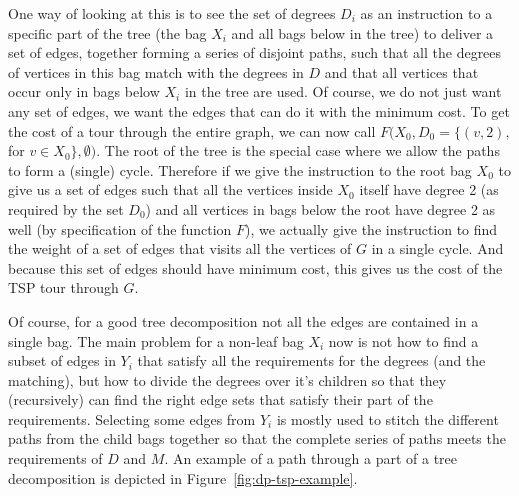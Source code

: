 \documentclass[12pt]{article}
\begin{document}
    One way of looking at this is to see the set of degrees $D_i$ as an instruction to a specific
    part of the tree (the bag $X_i$ and all bags below in the tree) to deliver a set of edges,
    together forming a series of disjoint paths, such that all the degrees of vertices in this bag
    match with the degrees in $D$ and that all vertices that occur only in bags below $X_i$ in the
    tree are used.
    Of course, we do not just want any set of edges, we want the edges that can do it with the
    minimum cost. To get the cost of a tour through the entire graph, we can now call
    $F(X_0, D_0=\{(v, 2),$ for $v \in X_0\}, \emptyset)$. The root of the tree is the special case
    where we allow the paths to form a (single) cycle. Therefore if we give the instruction to the
    root bag $X_0$ to give us a set of edges such that all the vertices inside $X_0$ itself have
    degree 2 (as required by the set $D_0$) and all vertices in bags below the root have degree 2 as
    well (by specification of the function $F$), we actually give the instruction to find the weight
    of a set of edges that visits all the vertices of $G$ in a single cycle. And because this set of
    edges should have minimum cost, this gives us the cost of the TSP tour through $G$.

    Of course, for a good tree decomposition not all the edges are contained in a single bag. The
    main problem for a non-leaf bag $X_i$ now is not how to find a subset of edges in $Y_i$ that
    satisfy all the requirements for the degrees (and the matching), but how to divide the degrees
    over it's children so that they (recursively) can find the right edge sets that satisfy their
    part of the requirements. Selecting some edges from $Y_i$ is mostly used to stitch the different
    paths from the child bags together so that the complete series of paths meets the requirements
    of $D$ and $M$.
    An example of a path through a part of a tree decomposition is depicted in
    Figure~\ref{fig:dp-tsp-example}.
\end{document}
